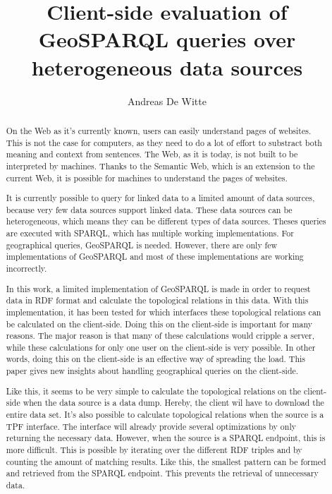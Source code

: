 \documentclass[twocolumn]{phdsymp} %
\begin{document}
\title{Client-side evaluation of GeoSPARQL queries over heterogeneous data sources} %

\author{Andreas De Witte}


\maketitle

\begin{abstract}
    On the Web as it's currently known, users can easily understand pages of websites. This is not the case for computers, as they need to do a lot of effort to substract both meaning and context from sentences. The Web, as it is today, is not built to be interpreted by machines. Thanks to the Semantic Web, which is an extension to the current Web, it is possible for machines to understand the pages of websites.

    It is currently possible to query for linked data to a limited amount of data sources, because very few data sources support linked data. These data sources can be heterogeneous, which means they can be different types of data sources. Theses queries are executed with SPARQL, which has multiple working implementations. For geographical queries, GeoSPARQL is needed. However, there are only few implementations of GeoSPARQL and most of these implementations are working incorrectly.

    In this work, a limited implementation of GeoSPARQL is made in order to request data in RDF format and calculate the topological relations in this data. With this implementation, it has been tested for which interfaces these topological relations can be calculated on the client-side. Doing this on the client-side is important for many reasons. The major reason is that many of these calculations would cripple a server, while these calculations for only one user on the client-side is very possible. In other words, doing this on the client-side is an effective way of spreading the load. This paper gives new insights about handling geographical queries on the client-side.

    Like this, it seems to be very simple to calculate the topological relations on the client-side when the data source is a data dump. Hereby, the client wil have to download the entire data set. It's also possible to calculate topological relations when the source is a TPF interface. The interface will already provide several optimizations by only returning the necessary data. However, when the source is a SPARQL endpoint, this is more difficult. This is possible by iterating over the different RDF triples and by counting the amount of matching results. Like this, the smallest pattern can be formed and retrieved from the SPARQL endpoint. This prevents the retrieval of unnecessary data.
    

\end{abstract}
\end{document}
